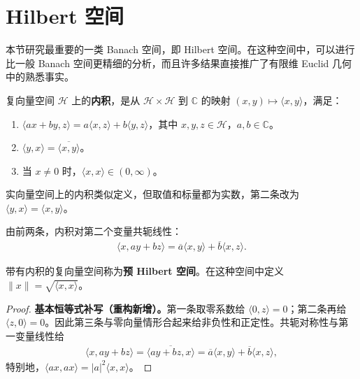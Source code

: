 \documentclass[../../main.tex]{subfiles}
\begin{document}
\section{Hilbert 空间}\label{section:ch05-hilbert-spaces}
本节研究最重要的一类 Banach 空间，即 Hilbert 空间。在这种空间中，可以进行比一般 Banach 空间更精细的分析，而且许多结果直接推广了有限维 Euclid 几何中的熟悉事实。
\begin{definition}[内积]\label{definition:ch05-inner-product}
复向量空间 $\mathscr H$ 上的\textbf{内积}，是从 $\mathscr H\times\mathscr H$ 到 $\mathbb C$ 的映射 $(x,y)\mapsto\langle x,y\rangle$，满足：
\begin{enumerate}
\item\label{item:ch05-inner-product-linearity} $\langle ax+by,z\rangle=a\langle x,z\rangle+b\langle y,z\rangle$，其中 $x,y,z\in\mathscr H$，$a,b\in\mathbb C$。
\item\label{item:ch05-inner-product-symmetry} $\langle y,x\rangle=\overline{\langle x,y\rangle}$。
\item\label{item:ch05-inner-product-positive} 当 $x\ne0$ 时，$\langle x,x\rangle\in(0,\infty)$。
\end{enumerate}
实向量空间上的内积类似定义，但取值和标量都为实数，第二条改为 $\langle y,x\rangle=\langle x,y\rangle$。
\end{definition}
由前两条，内积对第二个变量共轭线性：
\begin{align*}
\langle x,ay+bz\rangle=\overline a\langle x,y\rangle+\overline b\langle x,z\rangle.
\end{align*}
\begin{definition}\label{definition:ch05-prehilbert}
带有内积的复向量空间称为\textbf{预 Hilbert 空间}。在这种空间中定义 $\|x\|=\sqrt{\langle x,x\rangle}$。
\end{definition}
\begin{proof}
\textbf{基本恒等式补写（重构新增）。}第一条取零系数给 $\langle0,z\rangle=0$；第二条再给 $\langle z,0\rangle=0$。因此第三条与零向量情形合起来给非负性和正定性。共轭对称性与第一变量线性给
\begin{align*}
\langle x,ay+bz\rangle
=\overline{\langle ay+bz,x\rangle}
=\overline a\langle x,y\rangle+\overline b\langle x,z\rangle,
\end{align*}
特别地，$\langle ax,ax\rangle=|a|^2\langle x,x\rangle$。
\end{proof}
\end{document}
